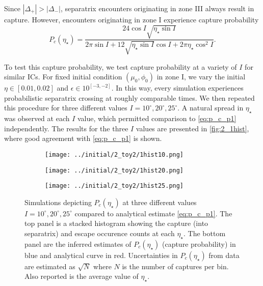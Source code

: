 \documentclass[
        fleqn,
        usenatbib,
    ]{mnras}
\newcommand*{\abs}[1]{\left|#1\right|}
\begin{document}
Since $\abs{\Delta_+} > \abs{\Delta_-}$, separatrix encounters originating in
zone III always result in capture. However, encounters originating in zone I
experience capture probability
\begin{equation}
    P_c(\eta_\star) = \frac{24\cos I \sqrt{\eta_\star \sin I}}{
        2\pi \sin I + 12\sqrt{\eta_\star \sin I}\cos I
            + 2\pi \eta_\star \cos^2 I}.\label{eq:p_c_p1}
\end{equation}

To test this capture probability, we test capture probability at a variety of
$I$ for similar ICs. For fixed initial condition $(\mu_0, \phi_0)$ in zone I, we
vary the initial $\eta \in [0.01, 0.02]$ and $\epsilon \in 10^{[-3, -2]}$. In
this way, every simulation experiences probabilistic separatrix crossing at
roughly comparable times. We then repeated this procedure for three different
values $I = 10^\circ, 20^\circ, 25^\circ$. A natural spread in $\eta_\star$ was
observed at each $I$ value, which permitted comparison to \autoref{eq:p_c_p1}
independently. The results for the three $I$ values are presented in
\autoref{fig:2_1hist}, where good agreement with
\autoref{eq:p_c_p1} is shown.
\begin{figure}
    \centering
    \begin{subfigure}{\columnwidth}
        \centering
        \texttt{[image: ../initial/2\_toy2/1hist10.png]}
    \end{subfigure}

    \begin{subfigure}{\columnwidth}
        \centering
        \texttt{[image: ../initial/2\_toy2/1hist20.png]}
    \end{subfigure}

    \begin{subfigure}{\columnwidth}
        \centering
        \texttt{[image: ../initial/2\_toy2/1hist25.png]}
    \end{subfigure}
    \caption{Simulations depicting $P_c(\eta_\star)$ at three different values
    $I = 10^\circ, 20^\circ, 25^\circ$ compared to analytical estimate
    \autoref{eq:p_c_p1}. The top panel is a stacked histogram showing the
    capture (into separatrix) and escape occurence counts at each $\eta_\star$.
    The bottom panel are the inferred estimates of $P_c(\eta_{\star})$ (capture
    probability) in blue and analytical curve in red. Uncertainties in
    $P_c(\eta_\star)$ from data are estimated as $\sqrt{N}$ where $N$ is the
    number of captures per bin. Also reported is the average value of
    $\eta_\star$.}\label{fig:2_1hist}
\end{figure}
\end{document}

